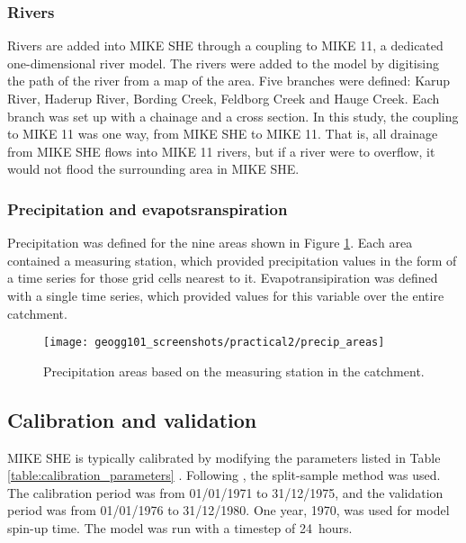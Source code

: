 \documentclass{article}
\begin{document}
\subsubsection{Rivers}

Rivers are added into MIKE SHE through a coupling to MIKE 11, a dedicated one-dimensional river model. The rivers were added to the model by digitising the path of the river from a map of the area. Five branches were defined: Karup River, Haderup River, Bording Creek, Feldborg Creek and Hauge Creek. Each branch was set up with a chainage and a cross section. In this study, the coupling to MIKE 11 was one way, from MIKE SHE to MIKE 11. That is, all drainage from MIKE SHE flows into MIKE 11 rivers, but if a river were to overflow, it would not flood the surrounding area in MIKE SHE.

\subsubsection{Precipitation and evapotsranspiration}

Precipitation was defined for the nine areas shown in Figure \ref{fig:precip_areas}. Each area contained a measuring station, which provided precipitation values in the form of a time series for those grid cells nearest to it. Evapotransipiration was defined with a single time series, which provided values for this variable over the entire catchment.

\begin{figure}[!h]
    \centering
    \texttt{[image: geogg101\_screenshots/practical2/precip\_areas]}
    \caption{Precipitation areas based on the measuring station in the catchment.}
    \label{fig:precip_areas}
\end{figure}



\subsection{Calibration and validation}
\label{sec:calibration}

MIKE SHE is typically calibrated by modifying the parameters listed in Table \ref{table:calibration_parameters} \parencite{refsgaard1997parameterisation, thompson2004simulation}. Following \textcite{klemevs1986operational}, the split-sample method was used. The calibration period was from 01/01/1971 to 31/12/1975, and the validation period was from 01/01/1976 to 31/12/1980. One year, 1970, was used for model spin-up time. The model was run with a timestep of \SI{24}{hours}.
\end{document}
